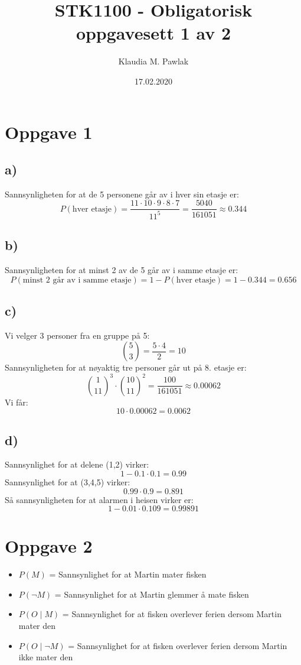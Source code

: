 \documentclass[a4paper, 12pt]{article}
\title{STK1100 - Obligatorisk oppgavesett 1 av 2}
\author{Klaudia M. Pawlak}
\date{17.02.2020}
\begin{document}
\maketitle

\section*{Oppgave 1}

\subsection*{a)}
Sannsynligheten for at de 5 personene går av i hver sin etasje er:
\[
P(\text{hver etasje}) = \frac{11 \cdot 10 \cdot 9 \cdot 8 \cdot 7}{11^5} = \frac{5040}{161051} \approx 0.344
\]

\subsection*{b)}
Sannsynligheten for at minst 2 av de 5 går av i samme etasje er:
\[
P(\text{minst 2 går av i samme etasje}) = 1 - P(\text{hver etasje}) = 1 - 0.344 = 0.656
\]

\subsection*{c)}
Vi velger 3 personer fra en gruppe på 5:
\[
\binom{5}{3} = \frac{5 \cdot 4}{2} = 10
\]
Sannsynligheten for at nøyaktig tre personer går ut på 8. etasje er:
\[
\binom{1}{11}^3 \cdot \binom{10}{11}^2 = \frac{100}{161051} \approx 0.00062
\]
Vi får:
\[
10 \cdot 0.00062 = 0.0062
\]

\subsection*{d)}
Sannsynlighet for at delene (1,2) virker:
\[
1 - 0.1 \cdot 0.1 = 0.99
\]
Sannsynlighet for at (3,4,5) virker:
\[
0.99 \cdot 0.9 = 0.891
\]
Så sannsynligheten for at alarmen i heisen virker er:
\[
1 - 0.01 \cdot 0.109 = 0.99891
\]

\section*{Oppgave 2}

\begin{itemize}
    \item \( P(M) \) = Sannsynlighet for at Martin mater fisken
    \item \( P(\neg M) \) = Sannsynlighet for at Martin glemmer å mate fisken
    \item \( P(O \mid M) \) = Sannsynlighet for at fisken overlever ferien dersom Martin mater den
    \item \( P(O \mid \neg M) \) = Sannsynlighet for at fisken overlever ferien dersom Martin ikke mater den
\end{itemize}
\end{document}

